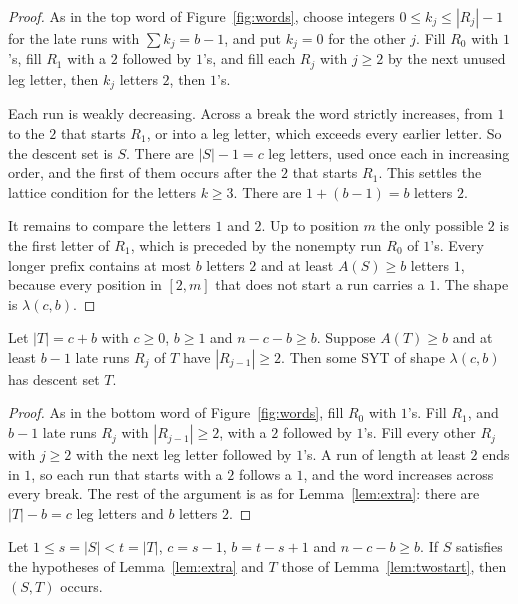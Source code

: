 \documentclass[12pt]{article}
\numberwithin{theorem}{section}
\numberwithin{equation}{section}
\begin{document}
\begin{proof}
As in the top word of Figure~\ref{fig:words}, choose integers $0\le k_j\le|R_j|-1$ for the late runs with $\sum k_j=b-1$, and put $k_j=0$ for the other
$j$. Fill $R_0$ with $1$'s, fill $R_1$ with a $2$ followed by $1$'s, and fill each $R_j$ with $j\ge2$ by the
next unused leg letter, then $k_j$ letters $2$, then $1$'s.

Each run is weakly decreasing. Across a break the word strictly increases, from $1$ to the $2$ that starts
$R_1$, or into a leg letter, which exceeds every earlier letter. So the descent set is $S$. There are
$|S|-1=c$ leg letters, used once each in increasing order, and the first of them occurs after the $2$ that
starts $R_1$. This settles the lattice condition for the letters $k\ge3$. There are $1+(b-1)=b$ letters $2$.

It remains to compare the letters $1$ and $2$. Up to position $m$ the only possible $2$ is the first letter
of $R_1$, which is preceded by the nonempty run $R_0$ of $1$'s. Every longer prefix contains at most $b$
letters $2$ and at least $A(S)\ge b$ letters $1$, because every position in $[2,m]$ that does not start a run
carries a $1$. The shape is $\lambda(c,b)$.
\end{proof}

\begin{lemma}\label{lem:twostart}
Let $|T|=c+b$ with $c\ge0$, $b\ge1$ and $n-c-b\ge b$. Suppose $A(T)\ge b$ and at least $b-1$ late runs $R_j$
of $T$ have $|R_{j-1}|\ge2$. Then some SYT of shape $\lambda(c,b)$ has descent set $T$.
\end{lemma}

\begin{proof}
As in the bottom word of Figure~\ref{fig:words}, fill $R_0$ with $1$'s. Fill $R_1$, and $b-1$ late runs $R_j$ with $|R_{j-1}|\ge2$, with a $2$ followed by
$1$'s. Fill every other $R_j$ with $j\ge2$ with the next leg letter followed by $1$'s. A run of length at
least $2$ ends in $1$, so each run that starts with a $2$ follows a $1$, and the word increases across every
break. The rest of the argument is as for Lemma~\ref{lem:extra}: there are $|T|-b=c$ leg letters and $b$
letters $2$.
\end{proof}

\begin{corollary}\label{cor:pair}
Let $1\le s=|S|<t=|T|$, $c=s-1$, $b=t-s+1$ and $n-c-b\ge b$. If $S$ satisfies the hypotheses of
Lemma~\ref{lem:extra} and $T$ those of Lemma~\ref{lem:twostart}, then $(S,T)$ occurs.
\end{corollary}
\end{document}
